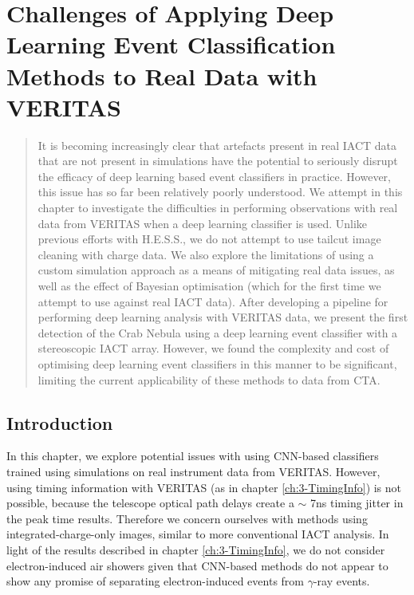\chapter{\label{ch:4-VERITASRealData} Challenges of Applying Deep Learning Event Classification Methods to Real Data with VERITAS}
\minitoc
\begin{abstract}
    It is becoming increasingly clear that artefacts present in real IACT data that are not present in simulations have the potential to seriously disrupt the efficacy of deep learning based event classifiers in practice. However, this issue has so far been relatively poorly understood. We attempt in this chapter to investigate the difficulties in performing observations with real data from VERITAS when a deep learning classifier is used. Unlike previous efforts with H.E.S.S., we do not attempt to use tailcut image cleaning with charge data. We also explore the limitations of using a custom simulation approach as a means of mitigating real data issues, as well as the effect of Bayesian optimisation (which for the first time we attempt to use against real IACT data). After developing a pipeline for performing deep learning analysis with VERITAS data, we present the first detection of the Crab Nebula using a deep learning event classifier with a stereoscopic IACT array. However, we found the complexity and cost of optimising deep learning event classifiers in this manner to be significant, limiting the current applicability of these methods to data from CTA.
\end{abstract}

\section{Introduction}

In this chapter, we explore potential issues with using CNN-based classifiers trained using simulations on real instrument data from VERITAS. However, using timing information with VERITAS (as in chapter \ref{ch:3-TimingInfo}) is not possible, because the telescope optical path delays create a $\sim$ 7ns timing jitter in the peak time results. Therefore we concern ourselves with methods using integrated-charge-only images, similar to more conventional IACT analysis. In light of the results described in chapter \ref{ch:3-TimingInfo}, we do not consider electron-induced air showers given that CNN-based methods do not appear to show any promise of separating electron-induced events from $\gamma$-ray events.

